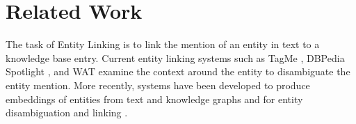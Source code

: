 \documentclass[sigconf,authordraft]{acmart}
\begin{document}



\section{Related Work}
\label{sec:Related Work}
The task of Entity Linking is to link the mention of an entity in text to a knowledge base entry. Current entity linking systems such as TagMe \cite{ferragina2010tagme}, DBPedia Spotlight \cite{mendes2011dbpedia}, %
and WAT \cite{piccinno2014wat} examine the context around the entity to disambiguate the entity mention. 
More recently, systems have been developed to produce embeddings of entities from text and knowledge graphs \cite{ristoski2016rdf2vec,yamada2016joint} and for entity disambiguation and linking \cite{yamada2017learning}. 
\end{document}
